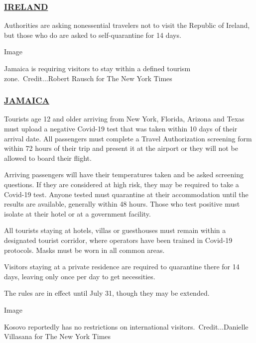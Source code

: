 \hypertarget{ireland}{%
\subsubsection{\texorpdfstring{\href{https://www.tourismireland.com/Press-Releases/2020/March/COVID-19-coronavirus}{IRELAND}}{IRELAND}}\label{ireland}}

Authorities are asking nonessential travelers not to visit the Republic
of Ireland, but those who do are asked to self-quarantine for 14 days.

Image

Jamaica is requiring visitors to stay within a defined tourism
zone.~Credit...Robert Rausch for The New York Times

\hypertarget{jamaica}{%
\subsubsection{\texorpdfstring{\href{https://www.visitjamaica.com/travelauthorization/}{JAMAICA}}{JAMAICA}}\label{jamaica}}

Tourists age 12 and older arriving from New York, Florida, Arizona and
Texas must upload a negative Covid-19 test that was taken within 10 days
of their arrival date. All passengers must complete a Travel
Authorization screening form within 72 hours of their trip and present
it at the airport or they will not be allowed to board their flight.

Arriving passengers will have their temperatures taken and be asked
screening questions. If they are considered at high risk, they may be
required to take a Covid-19 test. Anyone tested must quarantine at their
accommodation until the results are available, generally within 48
hours. Those who test positive must isolate at their hotel or at a
government facility.

All tourists staying at hotels, villas or guesthouses must remain within
a designated tourist corridor, where operators have been trained in
Covid-19 protocols. Masks must be worn in all common areas.

Visitors staying at a private residence are required to quarantine there
for 14 days, leaving only once per day to get necessities.

The rules are in effect until July 31, though they may be extended.

Image

Kosovo reportedly has no restrictions on international
visitors.~Credit...Danielle Villasana for The New York Times

